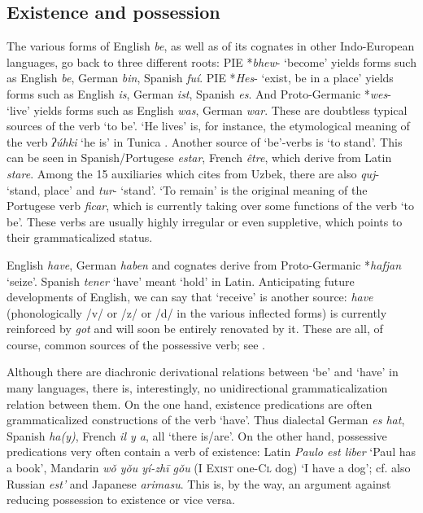 \subsection{Existence and possession}


The various forms of English \textit{be}, as well as of its cognates in other Indo-European languages, go back to three different roots: PIE *\textit{bhew}{}- ‘become’ yields forms such as English \textit{be}, German \textit{bin}, Spanish \textit{fuí}. PIE *\textit{Hes}{}- ‘exist, be in a place’ yields forms such as English \textit{is}, German \textit{ist}, Spanish \textit{es}. And Proto-Germanic *\textit{wes}{}- ‘live’ yields forms such as English \textit{was}, German \textit{war}. These are doubtless typical sources of the verb ‘to be’. ‘He lives’ is, for instance, the etymological meaning of the verb \textit{ʔúhki} ‘he is’ in Tunica \citep[41ff]{Haas1941}. Another source of ‘be’-verbs is ‘to stand’. This can be seen in Spanish/Portugese \textit{estar}, French \textit{être}, which derive from Latin \textit{stare}. Among the 15 auxiliaries which \citet[85f]{Žirmunskij1966} cites from Uzbek, there are also \textit{quj}{}- ‘stand, place’ and \textit{tur}{}- ‘stand’. ‘To remain’ is the original meaning of the Portugese verb \textit{ficar}, which is currently taking over some functions of the verb ‘to be’. These verbs are usually highly irregular or even suppletive, which points to their grammaticalized status.

English \textit{have}, German \textit{haben} and cognates derive from Proto-Germanic *\textit{hafjan} ‘seize’. Spanish \textit{tener} ‘have’ meant ‘hold’ in Latin. Anticipating future developments of English, we can say that ‘receive’ is another source: \textit{have} (phonologically /v/ or /z/ or /d/ in the various inflected forms) is currently reinforced by \textit{got} and will soon be entirely renovated by it. These are all, of course, common sources of the possessive verb; see \citet[104--106]{Seiler1983}.

Although there are diachronic derivational relations between ‘be’ and ‘have’ in many languages, there is, interestingly, no unidirectional grammaticalization relation between them. On the one hand, existence predications are often grammaticalized constructions of the verb ‘have’. Thus dialectal German \textit{es hat}, Spanish \textit{ha(y)}, French \textit{il y a}, all ‘there is/are’. On the other hand, possessive predications very often contain a verb of existence: Latin \textit{Paulo est liber} ‘Paul has a book’, Mandarin \textit{w\v{o} y\v{o}u yí-zh\=i g\v{o}u} (I \textsc{Exist} one-\textsc{Cl} dog) ‘I have a dog’; cf. also Russian \textit{est'} and Japanese \textit{arimasu}. This is, by the way, an argument against reducing possession to existence or vice versa.

